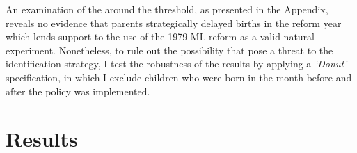 \label{rev_mlch: editor_selective_delivery}
An examination of the  around the threshold, as presented in the Appendix, reveals no evidence that parents strategically delayed births in the reform year which lends support to the use of the 1979 ML reform as a valid natural experiment. Nonetheless, to rule out the possibility that  pose a threat to the identification strategy, I test the robustness of the results by applying a \textit{`Donut'} specification, in which I exclude children who were born in the month before and after the policy was implemented.
 


	














\section{Results}\label{sec_mlch:results}

